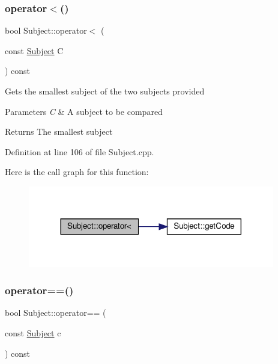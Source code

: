 \subsubsection{\texorpdfstring{operator$<$()}{operator<()}}
{\footnotesize\ttfamily bool Subject\+::operator$<$ (\begin{DoxyParamCaption}\item[{const \hyperlink{classSubject}{Subject}}]{C }\end{DoxyParamCaption}) const}

Gets the smallest subject of the two subjects provided 
\begin{DoxyParams}{Parameters}
{\em C} & A subject to be compared \\
\hline
\end{DoxyParams}
\begin{DoxyReturn}{Returns}
The smallest subject 
\end{DoxyReturn}


Definition at line 106 of file Subject.\+cpp.

Here is the call graph for this function\+:\nopagebreak
\begin{figure}[H]
\begin{center}
\leavevmode
\includegraphics[width=305pt]{classSubject_a2ba88df904eeb87b136764898ea3a1fc_cgraph}
\end{center}
\end{figure}
\mbox{\label{classSubject_acc7e7e8b0665e05dd9f0d78a6d79468f}} 
\subsubsection{\texorpdfstring{operator==()}{operator==()}}
{\footnotesize\ttfamily bool Subject\+::operator== (\begin{DoxyParamCaption}\item[{const \hyperlink{classSubject}{Subject}}]{c }\end{DoxyParamCaption}) const}

